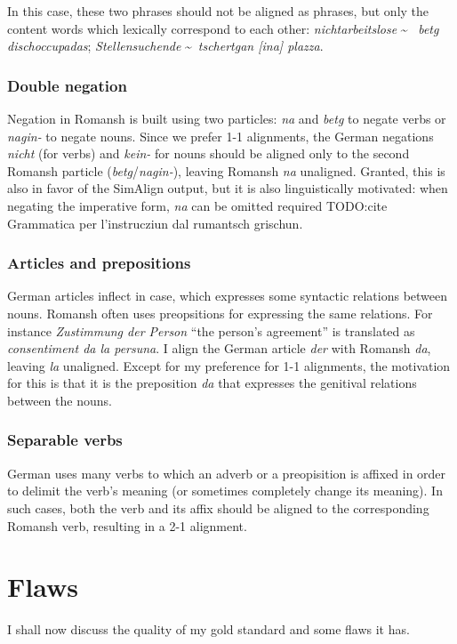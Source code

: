 In this case, these two phrases should not be aligned as phrases, but only the content words which lexically correspond to each other: \emph{nichtarbeitslose} \textasciitilde ~ \emph{betg dischoccupadas}; \emph{Stellensuchende} \textasciitilde ~\emph{tschertgan [ina] plazza}.

\subsubsection{Double negation}
Negation in Romansh is built using two particles: \emph{na} and \emph{betg} to negate verbs or \emph{nagin-} to negate nouns. 
Since we prefer 1-1 alignments, the German negations \emph{nicht} (for verbs) and \emph{kein-} for nouns should be aligned only to the second Romansh particle (\emph{betg}/\emph{nagin-}), leaving Romansh \emph{na} unaligned. 
Granted, this is also in favor of the SimAlign output, but it is also linguistically motivated: when negating the imperative form, \emph{na} can be omitted required TODO:cite Grammatica per l’instrucziun dal rumantsch grischun. 

\subsubsection{Articles and prepositions}
German articles inflect in case, which expresses some syntactic relations between nouns. 
Romansh often uses preopsitions for expressing the same relations. 
For instance \emph{Zustimmung der Person} \enquote{the person's agreement} is translated as \emph{consentiment da la persuna}. 
I align the German article \emph{der} with Romansh \emph{da}, leaving \emph{la} unaligned. 
Except for my preference for 1-1 alignments, the motivation for this is that it is the preposition \emph{da} that expresses the genitival relations between the nouns.

\subsubsection{Separable verbs}
German uses many verbs to which an adverb or a preopisition is affixed in order to delimit the verb's meaning (or sometimes completely change its meaning). 
In such cases, both the verb and its affix should be aligned to the corresponding Romansh verb, resulting in a 2-1 alignment.

\section{Flaws}
\label{sec:gold-flaws}
I shall now discuss the quality of my gold standard and some flaws it has.

